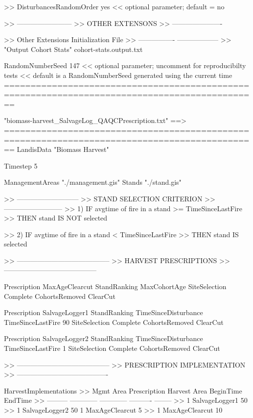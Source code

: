 >>   DisturbancesRandomOrder  yes  << optional parameter; default = no



>> ------------------------
>> OTHER EXTENSONS
>> ----------------------

>> 	Other Extensions         	Initialization File
>>	 ----------------         	------------------
>>  	 "Output Cohort Stats"    	cohort-stats.output.txt


 RandomNumberSeed  147  << optional parameter; uncomment for reproducibilty tests
                          << default is a RandomNumberSeed generated using the current time
==============================================================================================





"biomass-harvest_SalvageLog_QAQCPrescription.txt" ==>
==============================================================================================
LandisData  "Biomass Harvest"


Timestep    5

ManagementAreas 	"./management.gis"
Stands     		"./stand.gis"


>> ---------------------------
>> STAND SELECTION CRITERION
>> --------------------------
>>	1) IF avgtime of fire in a stand >= TimeSinceLastFire
>>	   THEN stand IS NOT selected	

>>	2) IF avgtime of fire in a stand < TimeSinceLastFire
>>	   THEN stand IS selected	



>> -----------------------------------------
>> HARVEST PRESCRIPTIONS
>> -----------------------------------------

Prescription MaxAgeClearcut
    StandRanking 	MaxCohortAge
    SiteSelection 	Complete
    CohortsRemoved 	ClearCut


Prescription	SalvageLogger1
    StandRanking		TimeSinceDisturbance 
    TimeSinceLastFire		90
    SiteSelection    		Complete
    CohortsRemoved   		ClearCut    


Prescription	SalvageLogger2
    StandRanking		TimeSinceDisturbance 
    TimeSinceLastFire		1
    SiteSelection    		Complete
    CohortsRemoved   		ClearCut  


>> -----------------------------------------
>> PRESCRIPTION IMPLEMENTATION 
>> ----------------------------------------

    HarvestImplementations
>>	Mgmt Area	Prescription	Harvest Area	BeginTime	EndTime
>>	---------	------------	------------	----------	--------
>>	1		SalvageLogger1		50%
>>	1		SalvageLogger2		50%
	1		MaxAgeClearcut		5%
>>	1		MaxAgeClearcut		10%


